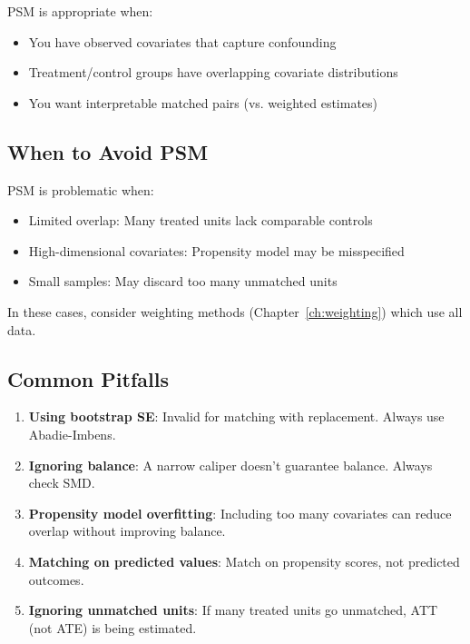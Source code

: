 PSM is appropriate when:
\begin{itemize}
    \item You have observed covariates that capture confounding
    \item Treatment/control groups have overlapping covariate distributions
    \item You want interpretable matched pairs (vs. weighted estimates)
\end{itemize}

\subsection{When to Avoid PSM}

PSM is problematic when:
\begin{itemize}
    \item Limited overlap: Many treated units lack comparable controls
    \item High-dimensional covariates: Propensity model may be misspecified
    \item Small samples: May discard too many unmatched units
\end{itemize}

In these cases, consider weighting methods (Chapter~\ref{ch:weighting}) which use all data.

\subsection{Common Pitfalls}

\begin{enumerate}
    \item \textbf{Using bootstrap SE}: Invalid for matching with replacement. Always use Abadie-Imbens.

    \item \textbf{Ignoring balance}: A narrow caliper doesn't guarantee balance. Always check SMD.

    \item \textbf{Propensity model overfitting}: Including too many covariates can reduce overlap without improving balance.

    \item \textbf{Matching on predicted values}: Match on propensity scores, not predicted outcomes.

    \item \textbf{Ignoring unmatched units}: If many treated units go unmatched, ATT (not ATE) is being estimated.
\end{enumerate}

